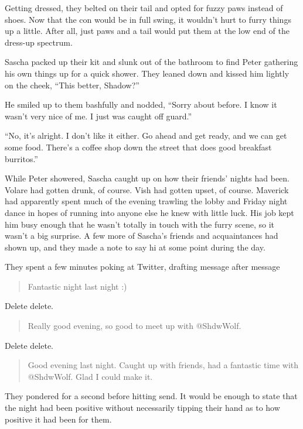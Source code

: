 Getting dressed, they belted on their tail and opted for fuzzy paws instead of shoes. Now that the con would be in full swing, it wouldn't hurt to furry things up a little. After all, just paws and a tail would put them at the low end of the dress-up spectrum.

Sascha packed up their kit and slunk out of the bathroom to find Peter gathering his own things up for a quick shower. They leaned down and kissed him lightly on the cheek, ``This better, Shadow?''

He smiled up to them bashfully and nodded, ``Sorry about before. I know it wasn't very nice of me. I just was caught off guard.''

``No, it's alright. I don't like it either. Go ahead and get ready, and we can get some food. There's a coffee shop down the street that does good breakfast burritos.''

While Peter showered, Sascha caught up on how their friends' nights had been. Volare had gotten drunk, of course. Vish had gotten upset, of course. Maverick had apparently spent much of the evening trawling the lobby and Friday night dance in hopes of running into anyone else he knew with little luck. His job kept him busy enough that he wasn't totally in touch with the furry scene, so it wasn't a big surprise. A few more of Sascha's friends and acquaintances had shown up, and they made a note to say hi at some point during the day.

They spent a few minutes poking at Twitter, drafting message after message

\begin{quote}
  Fantastic night last night :)
\end{quote}

Delete delete.

\begin{quote}
  Really good evening, so good to meet up with @ShdwWolf.
\end{quote}

Delete delete.

\begin{quote}
  Good evening last night. Caught up with friends, had a fantastic time with @ShdwWolf. Glad I could make it.
\end{quote}

They pondered for a second before hitting send. It would be enough to state that the night had been positive without necessarily tipping their hand as to how positive it had been for them.

